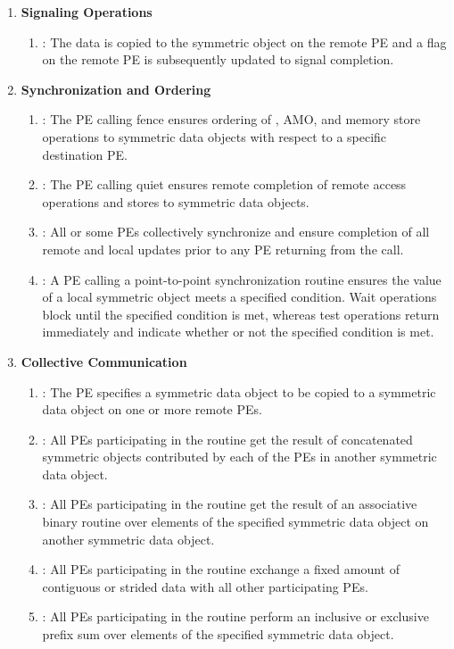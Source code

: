 \begin{enumerate}
\item \textbf{Signaling Operations}
\begin{enumerate}
  \item {}: The \source{} data is copied to the symmetric
        object on the remote \ac{PE} and a flag on the remote \ac{PE} is subsequently
        updated to signal completion.
\end{enumerate}

\item \textbf{Synchronization and Ordering}
\begin{enumerate}
  \item {}: The \ac{PE} calling fence ensures ordering of
  \PUT, \ac{AMO}, and memory store operations
  to symmetric data objects with respect to a specific
      destination \ac{PE}.
  \item {}: The \ac{PE} calling quiet ensures remote completion of remote access
      operations and stores to symmetric data objects.
  \item {}: All or some \acp{PE} collectively synchronize and ensure
      completion of all remote and local updates prior to any \ac{PE} returning
      from the call.
  \item {}: A \ac{PE} calling a point-to-point synchronization
      routine ensures the value of a local symmetric object meets a specified
      condition.  Wait operations block until the specified condition is
      met, whereas test operations return immediately and indicate whether or
      not the specified condition is met.
\end{enumerate}

\item \textbf{Collective Communication}
\begin{enumerate}
  \item {}: The  \ac{PE} specifies a symmetric data
      object to be copied to a symmetric data object on one or more remote
      \acp{PE}.
  \item {}: All \acp{PE} participating in the routine get the result
      of concatenated symmetric objects contributed by each of the \acp{PE} in
      another symmetric data object.
  \item {}: All \acp{PE} participating in the routine get the result
      of an associative binary routine over elements of the specified symmetric
      data object on another symmetric data object.
  \item {}: All \acp{PE} participating in the routine exchange
      a fixed amount of contiguous or strided data with all other participating
      \acp{PE}.
  \item {}: All \acp{PE} participating in the routine perform an
      inclusive or exclusive prefix sum over elements of the specified
      symmetric data object.
\end{enumerate}


\end{enumerate}
